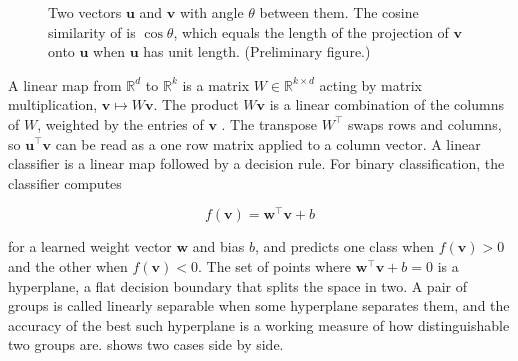 \begin{figure}[htbp]
\centering
{}
\caption{Two vectors $\mathbf{u}$ and $\mathbf{v}$ with angle $\theta$ between them. The cosine similarity of  is $\cos\theta$, which equals the length of the projection of $\mathbf{v}$ onto $\mathbf{u}$ when $\mathbf{u}$ has unit length. (Preliminary figure.)}
\label{fig:cosine}
\end{figure}

A linear map from $\mathbb{R}^d$ to $\mathbb{R}^k$ is a matrix $W \in \mathbb{R}^{k \times d}$ acting by matrix multiplication, $\mathbf{v} \mapsto W\mathbf{v}$.
The product $W\mathbf{v}$ is a linear combination of the columns of $W$, weighted by the entries of $\mathbf{v}$ \cite{lay2006linear}.
The transpose $W^\top$ swaps rows and columns, so $\mathbf{u}^\top \mathbf{v}$ can be read as a one row matrix applied to a column vector.
A linear classifier is a linear map followed by a decision rule.
For binary classification, the classifier computes

\begin{equation}
f(\mathbf{v}) = \mathbf{w}^\top \mathbf{v} + b
\label{eq:linearclassifier}
\end{equation}

for a learned weight vector $\mathbf{w}$ and bias $b$, and predicts one class when $f(\mathbf{v}) > 0$ and the other when $f(\mathbf{v}) < 0$.
The set of points where $\mathbf{w}^\top \mathbf{v} + b = 0$ is a hyperplane, a flat decision boundary that splits the space in two.
A pair of groups is called linearly separable when some hyperplane separates them, and the accuracy of the best such hyperplane is a working measure of how distinguishable two groups are.
 shows two cases side by side.

